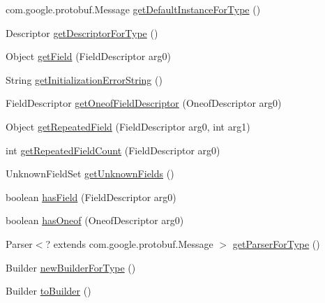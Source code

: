 \begin{DoxyCompactItemize}
\item 
com.\+google.\+protobuf.\+Message \mbox{\hyperlink{classcom_1_1mysql_1_1cj_1_1protocol_1_1x_1_1_x_message_ab319a0306b59b481e55d3198288061fa}{get\+Default\+Instance\+For\+Type}} ()
\item 
Descriptor \mbox{\hyperlink{classcom_1_1mysql_1_1cj_1_1protocol_1_1x_1_1_x_message_ac33235c01f5472cb950d51220c9505f3}{get\+Descriptor\+For\+Type}} ()
\item 
Object \mbox{\hyperlink{classcom_1_1mysql_1_1cj_1_1protocol_1_1x_1_1_x_message_a75513d09ed15c3fa913f907c1d917c5a}{get\+Field}} (Field\+Descriptor arg0)
\item 
String \mbox{\hyperlink{classcom_1_1mysql_1_1cj_1_1protocol_1_1x_1_1_x_message_a74b23253712f573519e8831f79cc9b9b}{get\+Initialization\+Error\+String}} ()
\item 
Field\+Descriptor \mbox{\hyperlink{classcom_1_1mysql_1_1cj_1_1protocol_1_1x_1_1_x_message_aa0e48e87c83c6a8592becacc68aa05cf}{get\+Oneof\+Field\+Descriptor}} (Oneof\+Descriptor arg0)
\item 
Object \mbox{\hyperlink{classcom_1_1mysql_1_1cj_1_1protocol_1_1x_1_1_x_message_a942085f6643a35b8431217a5ff67f79e}{get\+Repeated\+Field}} (Field\+Descriptor arg0, int arg1)
\item 
int \mbox{\hyperlink{classcom_1_1mysql_1_1cj_1_1protocol_1_1x_1_1_x_message_a17049fc01e514cb0dff7dee015479bdb}{get\+Repeated\+Field\+Count}} (Field\+Descriptor arg0)
\item 
Unknown\+Field\+Set \mbox{\hyperlink{classcom_1_1mysql_1_1cj_1_1protocol_1_1x_1_1_x_message_addce81146ac67391234d3aa7a96e617c}{get\+Unknown\+Fields}} ()
\item 
boolean \mbox{\hyperlink{classcom_1_1mysql_1_1cj_1_1protocol_1_1x_1_1_x_message_a6d06d4e5a726dc803135bdb5b2c6649b}{has\+Field}} (Field\+Descriptor arg0)
\item 
boolean \mbox{\hyperlink{classcom_1_1mysql_1_1cj_1_1protocol_1_1x_1_1_x_message_a7db076193101ff9fc72bd16ba6c78d43}{has\+Oneof}} (Oneof\+Descriptor arg0)
\item 
Parser$<$? extends com.\+google.\+protobuf.\+Message $>$ \mbox{\hyperlink{classcom_1_1mysql_1_1cj_1_1protocol_1_1x_1_1_x_message_a47c091a8f4c35c61a341b55fb8228fe8}{get\+Parser\+For\+Type}} ()
\item 
Builder \mbox{\hyperlink{classcom_1_1mysql_1_1cj_1_1protocol_1_1x_1_1_x_message_a14c6b1b4ae6e209068c8389afe35b94b}{new\+Builder\+For\+Type}} ()
\item 
Builder \mbox{\hyperlink{classcom_1_1mysql_1_1cj_1_1protocol_1_1x_1_1_x_message_ae30a12fd79b089e083d950c944c57b92}{to\+Builder}} ()
\end{DoxyCompactItemize}



